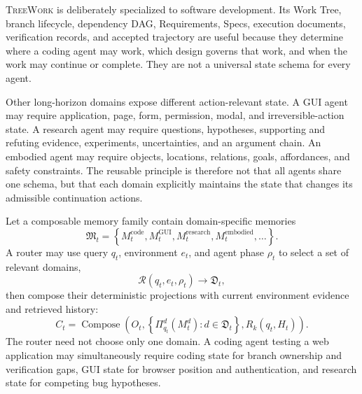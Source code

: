 \documentclass[11pt]{article}
\newcommand{\system}{\textsc{TreeWork}\xspace}
\theoremstyle{definition}
\begin{document}
\system is deliberately specialized to software development.  Its Work Tree,
branch lifecycle, dependency DAG, Requirements, Specs, execution documents,
verification records, and accepted trajectory are useful because they determine
where a coding agent may work, which design governs that work, and when the work
may continue or complete.  They are not a universal state schema for every
agent.

Other long-horizon domains expose different action-relevant state.  A GUI agent
may require application, page, form, permission, modal, and irreversible-action
state.  A research agent may require questions, hypotheses, supporting and
refuting evidence, experiments, uncertainties, and an argument chain.  An
embodied agent may require objects, locations, relations, goals, affordances,
and safety constraints.  The reusable principle is therefore not that all
agents share one schema, but that each domain explicitly maintains the state
that changes its admissible continuation actions.

Let a composable memory family contain domain-specific memories
\begin{equation}
  \mathfrak M_t
  =
  \left\{
    M_t^{\mathrm{code}},
    M_t^{\mathrm{GUI}},
    M_t^{\mathrm{research}},
    M_t^{\mathrm{embodied}},
    \ldots
  \right\}.
  \label{eq:domain-memory-family}
\end{equation}
A router may use query $q_t$, environment $e_t$, and agent phase $\rho_t$ to
select a set of relevant domains,
\begin{equation}
  \mathcal R(q_t,e_t,\rho_t)
  \longrightarrow
  \mathfrak D_t,
  \label{eq:state-memory-router}
\end{equation}
then compose their deterministic projections with current environment evidence
and retrieved history:
\begin{equation}
  C_t
  =
  \operatorname{Compose}\!\left(
    O_t,
    \left\{
      \Pi_{q_t}^{d}(M_t^d):d\in\mathfrak D_t
    \right\},
    R_k(q_t,H_t)
  \right).
  \label{eq:routed-state-composition}
\end{equation}
The router need not choose only one domain.  A coding agent testing a web
application may simultaneously require coding state for branch ownership and
verification gaps, GUI state for browser position and authentication, and
research state for competing bug hypotheses.
\end{document}
